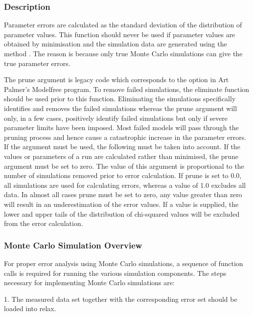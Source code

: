 \subsubsection{Description}

Parameter errors are calculated as the standard deviation of the distribution of parameter
values.  This function should never be used if parameter values are obtained by minimisation 
and the simulation data are generated using the method 
.  The reason is because only
true Monte Carlo simulations can give the true parameter errors.

The prune argument is legacy code which corresponds to the 
 option in Art Palmer's
Modelfree program.  To remove failed simulations, the eliminate function should be used
prior to this function.  Eliminating the simulations specifically identifies and removes the
failed simulations whereas the prune argument will only, in a few cases, positively identify
failed simulations but only if severe parameter limits  have been imposed.  Most failed
models will pass through the pruning process and hence cause a catastrophic increase in the
parameter errors.  If the argument must be used, the following must be taken into account.
If the values or parameters of a run are calculated rather than minimised,  the prune
argument must be set to zero.  The value of this argument is proportional to the number of
simulations removed prior to error calculation.  If prune is set to 0.0, all simulations are
used for calculating errors, whereas a value of 1.0 excludes all data.  In almost all cases
prune must be set to zero, any value greater than zero will result in an underestimation of
the error values.  If a value is supplied, the lower and upper tails of the distribution of
chi-squared  values will be excluded from the error calculation.



\subsubsection{Monte Carlo Simulation Overview}

For proper error analysis using Monte Carlo simulations, a sequence  of function calls is
required for running the various simulation components.  The steps necessary for
implementing Monte Carlo simulations are:

1.  The measured data set together with the corresponding error set should be loaded into
relax.

